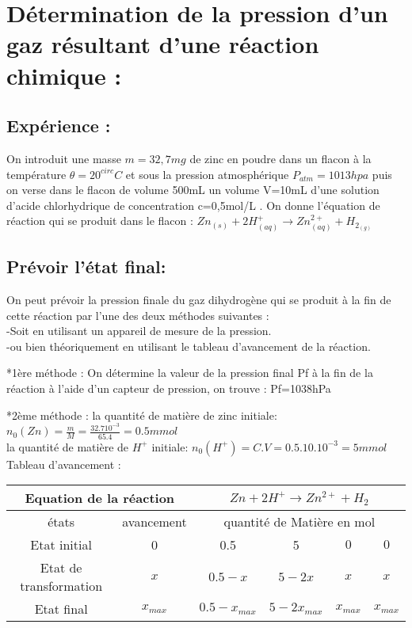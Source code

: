 \documentclass[12pt]{article}
\begin{document}
\section{Détermination de la pression d’un gaz résultant d’une réaction chimique : }
\subsection{Expérience : }

On introduit une masse $m = 32,7mg$ de zinc en poudre dans un flacon à la température $\theta = 20^{circ}C$ et sous la pression atmosphérique $P_{atm} = 1013hpa$ puis on verse dans le flacon de volume 500mL un volume V=10mL d’une solution d’acide chlorhydrique de concentration c=0,5mol/L .
On donne l'équation de réaction qui se produit dans le flacon : 
$Zn_{(s)} + 2H^{+}_{(aq)} \rightarrow Zn^{2+}_{(aq)} + H_{2_{(g)}}$

\subsection{ Prévoir l’état final:  }
On peut prévoir la pression finale du gaz dihydrogène qui se produit à la fin de cette réaction par l’une des deux méthodes
suivantes : 
\\-Soit en utilisant un appareil de mesure de la pression.\\
-ou bien théoriquement en utilisant le tableau d’avancement de la réaction.


*1ère méthode : On détermine la valeur de la pression final Pf à la fin de la réaction à l’aide d’un capteur de pression,
on trouve : Pf=1038hPa

*2ème méthode : 
la quantité de matière de zinc initiale: $n_0(Zn) = \frac{m}{M} = \frac{32.7 10^{-3}}{65.4} = 0.5mmol$\\
la quantité de matière de $H^+$ initiale: $n_0(H^+) = C.V = 0.5.10.10^{-3} =  5mmol$\\

Tableau d'avancement : 

\begin{tabular}{|c|c|c|c|c|c|}
    \hline
    \multicolumn{2}{|c|}{Equation de la réaction}& \multicolumn{4}{c|}{${ Zn + 2H^+   \rightarrow Zn^{2+} + H_2}$}\\\hline
    états  & avancement& \multicolumn{4}{|c|}{quantité de Matière en mol}\\\hline
    Etat initial          &    0        &  0.5              &   5            & $ 0$       & $ 0$ \\\hline
    Etat de transformation&    $x$      & $0.5 - x$         & $ 5 - 2x$       & $x$        & $x$ \\\hline
    Etat final            &    $x_{max}$& $ 0.5 - x_{max}$  & $ 5 - 2 x_{max}$& $x_{max}$  & $ x_{max}$ \\\hline
\end{tabular}
\end{document}
